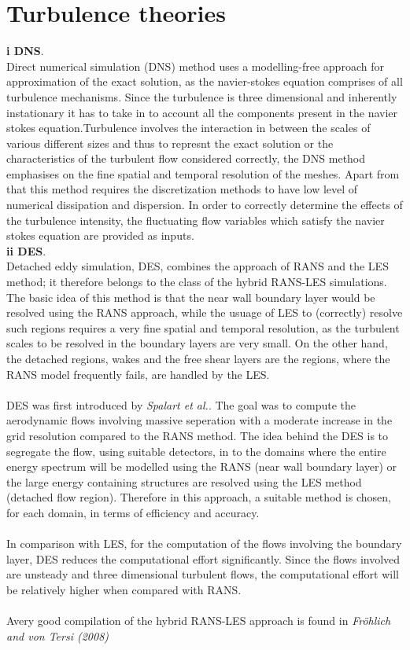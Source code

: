 \newpage
\section{Turbulence theories}

{\bf i DNS}.\\
Direct numerical simulation (DNS) method uses a modelling-free approach for approximation of the exact solution, as the navier-stokes equation comprises of all turbulence mechanisms. Since the turbulence is three dimensional and inherently instationary it has to take in to account all the components present in the navier stokes equation.Turbulence involves the interaction in between the scales of various different sizes and thus to represnt the exact solution or the characteristics of the turbulent flow considered correctly, the DNS method emphasises on the fine spatial and temporal resolution of the meshes. Apart from that this method requires the discretization methods to have low level of numerical dissipation and dispersion. In order to correctly determine the effects of the turbulence intensity, the fluctuating flow variables which satisfy the navier stokes equation are provided as inputs.
\\
{\bf ii DES}.\\
Detached eddy simulation, DES, combines the approach of RANS and the LES method; it therefore belongs to the class of the hybrid RANS-LES simulations. The basic idea of this method is that the near wall boundary layer would be resolved using the RANS approach, while the usuage of LES to (correctly) resolve such regions requires a very fine spatial and temporal resolution, as the turbulent scales to be resolved in the boundary layers are very small. On the other hand, the detached regions, wakes and the free shear layers are the regions, where the RANS model frequently fails, are handled by the LES.\\
\\
 DES was first introduced by {\it Spalart et al.}. The goal was to compute the aerodynamic flows involving massive seperation with a moderate increase in the grid resolution compared to the RANS method. The idea behind the DES is to segregate the flow, using suitable detectors, in to the domains where the entire energy spectrum will be modelled using the RANS (near wall boundary layer) or the large energy containing structures are resolved using the LES method (detached flow region). Therefore in this approach, a suitable method is chosen, for each domain, in terms of efficiency and accuracy.\\
\\
In comparison with LES, for the computation of the flows involving the boundary layer, DES reduces the computational effort significantly. Since the flows involved are unsteady and three dimensional turbulent flows, the computational effort will be relatively higher when compared with RANS.\\
\\
Avery good compilation of the hybrid RANS-LES approach is found in {\it Fröhlich and von Tersi (2008)}\\
